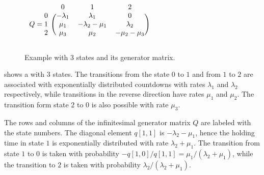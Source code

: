 \begin{figure}%
  \begin{minipage}{.5\textwidth}
    \centering
  \end{minipage}%
  \begin{minipage}{.5\textwidth}
    \centering
    \(\begin{blockarray}{rccc}
      & 0 & 1 & 2 \\
      \begin{block}{r(ccc)}
        0 & -\lambda_1 & \lambda_1 & 0 \\
        Q = 1 & \mu_1 & -\lambda_2 - \mu_1 & \lambda_2 \\
        2 & \mu_3 & \mu_2 & -\mu_2 - \mu_3 \\
      \end{block}
    \end{blockarray}\)
  \end{minipage}
  \caption{Example  with 3 states and its generator matrix.}
  \label{fig:background:ctmc-repair}
\end{figure}

\begin{example}
   shows a  with 3 states. The transitions from the state \(0\) to \(1\) and from \(1\) to \(2\) are associated with exponentially distributed countdowns with rates \(\lambda_1\) and \(\lambda_2\) respectively, while transitions in the reverse direction have rates \(\mu_1\) and \(\mu_2\). The transition form state \(2\) to \(0\) is also possible with rate $\mu_3$.
  
  The rows  and columns  of the infinitesimal generator matrix \(Q\) are labeled with the state numbers. The diagonal element \(q[1, 1]\) is \(-\lambda_2 - \mu_1\), hence the holding time in state \(1\) is exponentially distributed with rate \(\lambda_2 + \mu_1\). The transition from state \(1\) to \(0\) is taken with probability \(-q[1, 0] / q[1, 1] = \mu_1 / (\lambda_2 + \mu_1)\), while the transition to \(2\) is taken with probability \(\lambda_2 / (\lambda_2 + \mu_1)\).
\end{example}

